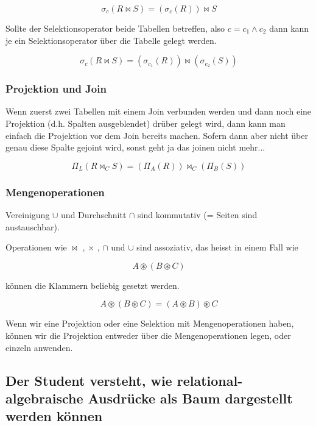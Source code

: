 \begin{equation}
  \sigma _c (R \bowtie S) =  (\sigma _c  (R))\bowtie S
\end{equation}

Sollte der Selektionsoperator beide Tabellen betreffen, also \(c = c_1 \wedge c_2\) dann kann je ein Selektionsoperator über die Tabelle gelegt werden.

\begin{equation}
  \sigma _c (R\bowtie S) = (\sigma _ {c_1} (R)) \bowtie (\sigma _ {c_2} (S))
\end{equation}

\subsubsection{Projektion und Join}
Wenn zuerst zwei Tabellen mit einem Join verbunden werden und dann noch eine Projektion (d.h. Spalten ausgeblendet) drüber gelegt wird, dann kann man einfach die Projektion vor dem Join bereits machen. Sofern dann aber nicht über genau diese Spalte gejoint wird, sonst geht ja das joinen nicht mehr...

\begin{equation}
  \Pi _{L} (R \bowtie _C S) = (\Pi _{A} (R)) \bowtie _C (\Pi _B (S))
\end{equation}

\subsubsection{Mengenoperationen}
Vereinigung \(\cup\) und Durchschnitt \(\cap\) sind kommutativ (= Seiten sind austauschbar).

Operationen wie \(\bowtie\) , \(\times\) , \(\cap\) und \(\cup\) sind assoziativ, das heisst in einem Fall wie

\begin{equation}
  A \circledast (B \circledast C)
\end{equation}

können die Klammern beliebig gesetzt werden.

\begin{equation}
  A \circledast (B \circledast C) = (A \circledast B) \circledast C
\end{equation}


Wenn wir eine Projektion oder eine Selektion mit Mengenoperationen haben, können wir die Projektion entweder über die Mengenoperationen legen, oder einzeln anwenden.

\subsection{Der Student versteht, wie relational-algebraische Ausdrücke als Baum dargestellt werden können}
\label{sec:anfragebaum}

